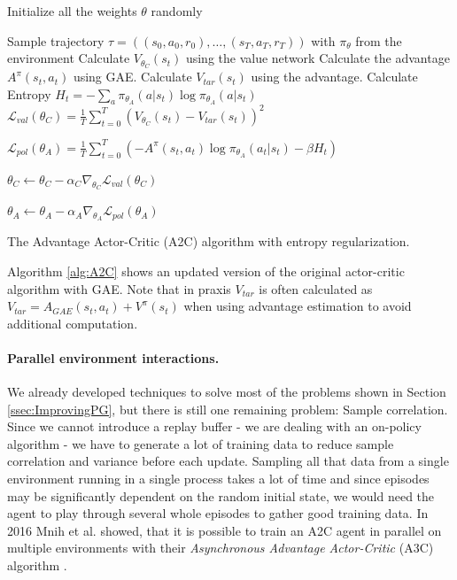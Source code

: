 \begin{algorithm}[ht]
  Initialize all the weights $\theta$ randomly \;
    {
   Sample trajectory $\tau = ((s_0, a_0, r_0), \dots, (s_T, a_T, r_T))$ with $\pi_\theta$ from the environment \;
      {
      Calculate $V_{\theta_C}(s_t)$ using the value network \;
      Calculate the advantage $A^\pi(s_t, a_t)$ using GAE. \;
      Calculate $V_{tar}(s_t)$ using the advantage. \;
      Calculate Entropy $H_t = - \sum_a \pi_{\theta_A}(a|s_t) \log \pi_{\theta_A}(a|s_t)$ \;
    }
    $\mathcal{L}_{val}(\theta_C) = \frac{1}{T} \sum^T_{t=0}(V_{\theta_C}(s_t) - V_{tar}(s_t))^2$ 

    $\mathcal{L}_{pol}(\theta_A) = \frac{1}{T} \sum^T_{t=0}\left(-A^\pi(s_t, a_t) \log \pi_{\theta_A}(a_t|s_t) - \beta H_t\right)$ 

    $\theta_C \leftarrow \theta_C - \alpha_C \nabla_{\theta_C} \mathcal{L}_{val}(\theta_C)$ 
  
    $\theta_A \leftarrow \theta_A - \alpha_A \nabla_{\theta_A} \mathcal{L}_{pol}(\theta_A)$ 

  }

  \caption[The Advantage Actor-Critic Algorithm]{The Advantage Actor-Critic (A2C) algorithm with entropy regularization.}\label{alg:A2C}
 \end{algorithm}

Algorithm \ref{alg:A2C} shows an updated version of the original actor-critic algorithm with GAE. Note that in praxis $V_{tar}$ is often calculated as $V_{tar} = A_{GAE}(s_t, a_t) + V^\pi(s_t)$ when using advantage estimation to avoid additional computation. 

\paragraph{Parallel environment interactions.}
We already developed techniques to solve most of the problems shown in Section \ref{ssec:ImprovingPG}, but there is still one remaining problem: Sample correlation. Since we cannot introduce a replay buffer - we are dealing with an on-policy algorithm - we have to generate a lot of training data to reduce sample correlation and variance before each update. Sampling all that data from a single environment running in a single process takes a lot of time and since episodes may be significantly dependent on the random initial state, we would need the agent to play through several whole episodes to gather good training data. In 2016 Mnih et al. showed, that it is possible to train an A2C agent in parallel on multiple environments with their \textit{Asynchronous Advantage Actor-Critic} (A3C) algorithm \cite{mnih2016asynchronous}.

